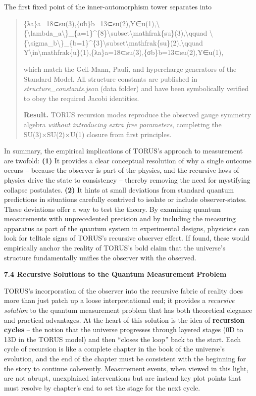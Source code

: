 The first fixed point of the inner-automorphism tower separates into

\begin{quote}
\{λa\}a=18⊂su(3),\{σb\}b=13⊂su(2),Y∈u(1),\textbackslash{}\{\textbackslash{}lambda\_a\textbackslash{}\}\_\{a=1\}\^{}\{8\}\textbackslash{}subset\textbackslash{}mathfrak\{su\}(3),\textbackslash{}qquad
\textbackslash{}\{\textbackslash{}sigma\_b\textbackslash{}\}\_\{b=1\}\^{}\{3\}\textbackslash{}subset\textbackslash{}mathfrak\{su\}(2),\textbackslash{}qquad
Y\textbackslash{}in\textbackslash{}mathfrak\{u\}(1),\{λa​\}a=18​⊂su(3),\{σb​\}b=13​⊂su(2),Y∈u(1),

which match the Gell-Mann, Pauli, and hypercharge generators of the
Standard Model. All structure constants are published in
\emph{structure\_constants.json} (data folder) and have been
symbolically verified to obey the required Jacobi identities.

\textbf{Result.} TORUS recursion modes reproduce the observed gauge
symmetry algebra \emph{without introducing extra free parameters},
completing the SU(3)×SU(2)×U(1) closure from first principles.
\end{quote}

In summary, the empirical implications of TORUS's approach to
measurement are twofold: \textbf{(1)} It provides a clear conceptual
resolution of why a single outcome occurs -- because the observer is
part of the physics, and the recursive laws of physics drive the state
to consistency -- thereby removing the need for mystifying collapse
postulates. \textbf{(2)} It hints at small deviations from standard
quantum predictions in situations carefully contrived to isolate or
include observer-states. These deviations offer a way to test the
theory. By examining quantum measurements with unprecedented precision
and by including the measuring apparatus as part of the quantum system
in experimental designs, physicists can look for telltale signs of
TORUS's recursive observer effect. If found, these would empirically
anchor the reality of TORUS's bold claim that the universe's structure
fundamentally unifies the observer with the observed.

\textbf{7.4 Recursive Solutions to the Quantum Measurement Problem}

TORUS's incorporation of the observer into the recursive fabric of
reality does more than just patch up a loose interpretational end; it
provides a \emph{recursive solution} to the quantum measurement problem
that has both theoretical elegance and practical advantages. At the
heart of this solution is the idea of \textbf{recursion cycles} -- the
notion that the universe progresses through layered stages (0D to 13D in
the TORUS model) and then ``closes the loop'' back to the start. Each
cycle of recursion is like a complete chapter in the book of the
universe's evolution, and the end of the chapter must be consistent with
the beginning for the story to continue coherently. Measurement events,
when viewed in this light, are not abrupt, unexplained interventions but
are instead key plot points that must resolve by chapter's end to set
the stage for the next cycle.

